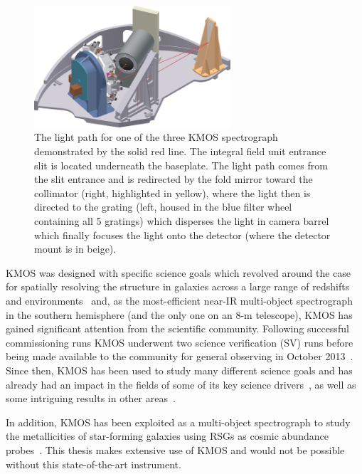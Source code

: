 \begin{figure}
 \centering
 \includegraphics[width=0.65\textwidth]{kmos/kmos-spectrograph}
 \caption[The KMOS light path]{The light path for one of the three KMOS spectrograph demonstrated by the solid red line.
 The integral field unit entrance slit is located underneath the baseplate.
 The light path comes from the slit entrance and is redirected by the fold mirror toward the collimator (right, highlighted in yellow), where the light then is directed to the grating (left, housed in the blue filter wheel containing all 5 gratings) which disperses the light in camera barrel which finally focuses the light onto the detector (where the detector mount is in beige).
 \label{fig:kmoslight}}
\end{figure}

KMOS was designed with specific science goals which revolved around the case for spatially resolving the structure in galaxies across a large range of redshifts and environments~\citep{2006NewAR..50..370S} and,
as the most-efficient near-IR multi-object spectrograph in the southern hemisphere (and the only one on an 8-m telescope),
KMOS has gained significant attention from the scientific community.
Following successful commissioning runs KMOS underwent two science verification (SV) runs before being made available to the community for general observing in October 2013~\citep{2015IAUS..309...11S}.
Since then, KMOS has been used to study many different science goals and has already had an impact in the fields of some of its key science drivers~\citep{2016MNRAS.456.1195H,2016MNRAS.456.4533M}, as well as some intriguing results in other areas~\citep{2015A&A...584A...2F,2015MNRAS.453.3875P}.

In addition, KMOS has been exploited as a multi-object spectrograph to study the metallicities of star-forming galaxies using RSGs as cosmic abundance probes~\citep{2015ApJ...805..182G,2015ApJ...812..160L,2015ApJ...803...14P}.
This thesis makes extensive use of KMOS and would not be possible without this state-of-the-art instrument.


